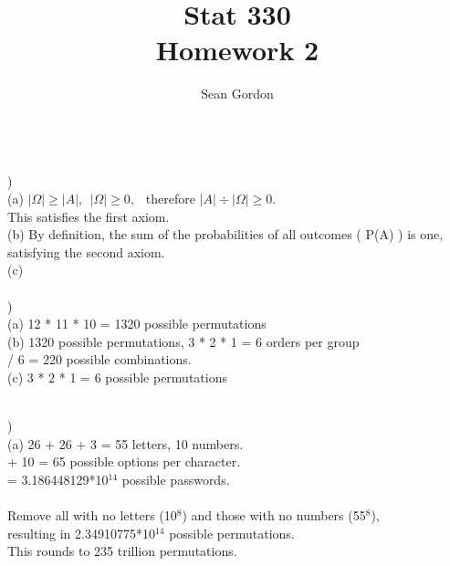 \documentclass[12pt]{article}
\title{Stat 330\\Homework 2}
\author{Sean Gordon}
\begin{document}
\maketitle


\hrulefill \\


)\\
\indent (a) $|\Omega| \ge |A|,\ \ |\Omega| \ge 0,\ \ $ therefore $ |A| \div |\Omega| \ge 0$. \\
\indent This satisfies the first axiom.\\

(b) By definition, the sum of the probabilities of all outcomes ( P(A) ) is one, \\
\indent satisfying the second axiom.\\

(c)\\

\hrulefill \\


)\\
\indent (a) 12 * 11 * 10 = 1320 possible permutations\\

\indent (b) 1320 possible permutations, 3 * 2 * 1 = 6 orders per group\\
\indent {} / 6 = 220 possible combinations.\\

\indent (c) 3 * 2 * 1 = 6 possible permutations\\


\hrulefill \\
\pagebreak


)\\
\indent (a) 26 + 26 + 3 = 55 letters, 10 numbers.\\
\indent {} + 10 = 65 possible options per character.\\
\indent {} = 3.186448129*10{\large$^{14}$} possible passwords.\\\\
\indent \indent Remove all with no letters (10{\large$^8$}) and those with no numbers (55{\large$^8$}),\\
\indent \indent resulting in 2.34910775*10{\large$^{14}$} possible permutations. \\
\indent \indent This rounds to 235 trillion permutations.\\


\hrulefill \\
\end{document}
